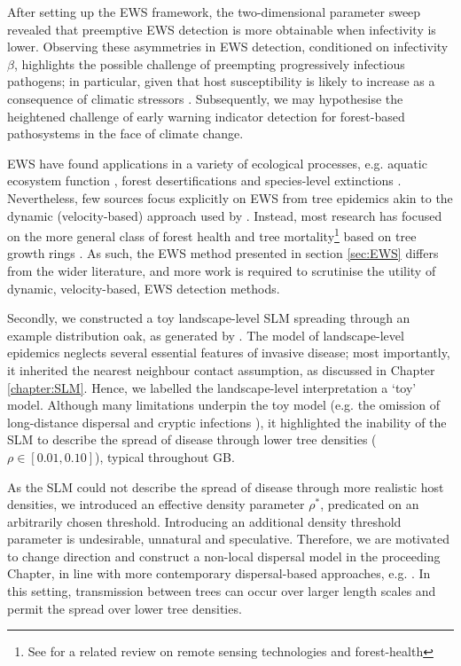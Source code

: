 After setting up the EWS framework, the two-dimensional parameter sweep revealed that preemptive EWS detection is more obtainable 
when infectivity is lower. Observing these asymmetries in EWS detection, conditioned on infectivity
$\beta$, highlights the possible challenge of preempting progressively infectious pathogens;
in particular, given that host susceptibility is likely to increase as a consequence of climatic stressors \cite{garrett2006climate}.
Subsequently, we may hypothesise the heightened challenge of early warning indicator detection for forest-based pathosystems in the face of climate change.

EWS have found applications in a variety of ecological processes, 
e.g. aquatic ecosystem function \cite{kramer1991aquatic}, forest desertifications \cite{yang2005desertification}
and species-level extinctions \cite{drake2010early}.
Nevertheless, few sources focus explicitly on EWS from tree epidemics akin to the dynamic (velocity-based) 
approach used by \cite{OROZCOFUENTES201912}. Instead, most research has focused on the more general class of forest
health and tree mortality\footnote{See \cite{torres2021role} for a related review on remote sensing technologies and forest-health} based on tree growth rings \cite{rogers2018detecting, mamet2015tree}. 
As such, the EWS method presented in section \ref{sec:EWS} differs from the wider literature,
and more work is required to scrutinise the utility of dynamic, velocity-based, EWS detection methods.

Secondly, we constructed a toy landscape-level SLM spreading through an example distribution oak, as generated by \cite{hill.data}.
The model of landscape-level epidemics neglects several essential features of invasive disease; most importantly, 
it inherited the nearest neighbour contact assumption, as discussed in Chapter \ref{chapter:SLM}.
Hence, we labelled the landscape-level interpretation a `toy' model.
Although many limitations underpin the toy model (e.g. the omission of long-distance dispersal \cite{long-range-dispersal}
and cryptic infections \cite{gilligan2007impact}), it highlighted the inability of the SLM to describe the spread of disease
through lower tree densities ($\rho \in [0.01, 0.10]$), typical throughout GB.

As the SLM could not describe the spread of disease through more realistic host densities, 
we introduced an effective density parameter $\rho^*$, predicated on an arbitrarily chosen threshold.
Introducing an additional density threshold parameter is undesirable, unnatural and speculative.
Therefore, we are motivated to change direction and construct a non-local dispersal model in the proceeding Chapter, in line with more contemporary dispersal-based approaches, e.g. \cite{parnell2009optimal, meentemeyer2011epidemiological}.
In this setting, transmission between trees can occur over larger length scales and permit the spread over lower tree densities. 

